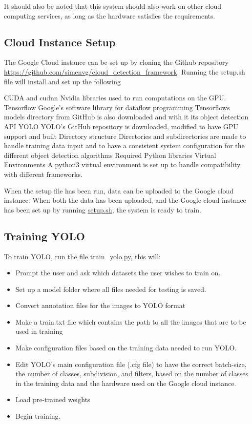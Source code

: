 \vspace{3mm}

It should also be noted that this system should also work on other cloud computing services, as long as the hardware satisfies the requirements. 

\subsection{Cloud Instance Setup}
The Google Cloud instance can be set up by cloning the Github repository \url{https://github.com/simenvg/cloud_detection_framework}. Running the setup.sh file will install and set up the following 

\begin{outline}
    \1 CUDA and cudnn
       \2 Nvidia libraries used to run computations on the GPU. 
    \1 Tensorflow
       \2 Google's software library for dataflow programming
       \2 Tensorflows models directory from GitHub is also downloaded and with it its object detection API
    \1 YOLO
       \2 YOLO's GitHub repository is downloaded, modified to have GPU support and built
    \1 Directory structure
       \2 Directories and subdirectories are made to handle training data input and to have a consistent system configuration for the different object detection algorithms
    \1 Required Python libraries
    \1 Virtual Environments
       \2 A python3 virtual environment is set up to handle compatibility with different frameworks.
\end{outline}



When the setup file has been run, data can be uploaded to the Google cloud instance. When both the data has been uploaded, and the Google cloud instance has been set up by running \url{setup.sh}, the system is ready to train.

\subsection{Training YOLO}
To train YOLO, run the file \url{train_yolo.py}, this will:

\begin{itemize}
    \item Prompt the user and ask which datasets the user wishes to train on.
    \item Set up a model folder where all files needed for testing is saved.
    \item Convert annotation files for the images to YOLO format
    \item Make a train.txt file which contains the path to all the images that are to be used in training
    \item Make configuration files based on the training data needed to run YOLO.
    \item Edit YOLO's main configuration file (.cfg file) to have the correct batch-size, the number of classes, subdivision, and filters, based on the number of classes in the training data and the hardware used on the Google cloud instance.
    \item Load pre-trained weights
    \item Begin training.
\end{itemize}

